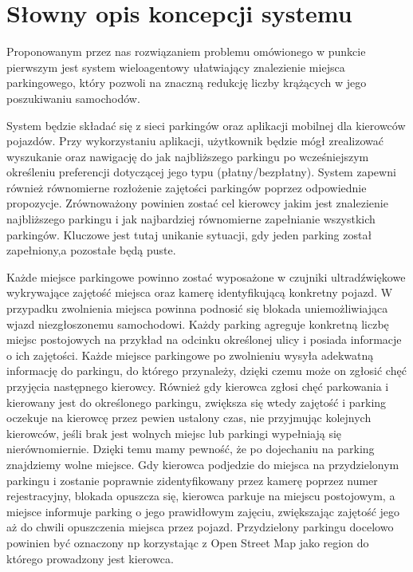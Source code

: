 \newpage
\section{Słowny opis koncepcji systemu}

Proponowanym przez nas rozwiązaniem problemu omówionego w punkcie pierwszym jest system wieloagentowy ułatwiający znalezienie miejsca parkingowego, który pozwoli na znaczną redukcję liczby krążących w jego poszukiwaniu samochodów.

System będzie składać się z sieci parkingów oraz aplikacji mobilnej dla kierowców pojazdów. Przy wykorzystaniu aplikacji, użytkownik będzie mógł zrealizować wyszukanie oraz nawigację do jak najbliższego parkingu po wcześniejszym określeniu preferencji dotyczącej jego typu (płatny/bezpłatny).  System zapewni również równomierne rozłożenie zajętości parkingów poprzez odpowiednie propozycje. Zrównoważony powinien zostać cel kierowcy jakim jest znalezienie najbliższego parkingu i jak najbardziej równomierne zapełnianie wszystkich parkingów. Kluczowe jest tutaj unikanie sytuacji, gdy  jeden parking został zapełniony,a pozostałe będą puste.

Każde miejsce parkingowe powinno zostać wyposażone w czujniki ultradźwiękowe wykrywające zajętość miejsca oraz kamerę identyfikującą konkretny pojazd. W przypadku zwolnienia miejsca powinna podnosić się blokada uniemożliwiająca wjazd niezgłoszonemu samochodowi. Każdy parking agreguje konkretną liczbę miejsc postojowych na przykład na odcinku określonej ulicy i posiada informacje o ich zajętości. Każde miejsce parkingowe po zwolnieniu wysyła adekwatną informację do parkingu, do którego przynależy, dzięki czemu może on zgłosić chęć przyjęcia następnego kierowcy. Również gdy kierowca zgłosi chęć parkowania i kierowany jest do określonego parkingu, zwiększa się wtedy zajętość i parking oczekuje na kierowcę przez pewien ustalony czas, nie przyjmując kolejnych kierowców, jeśli brak jest wolnych miejsc lub parkingi wypełniają się nierównomiernie. Dzięki temu mamy pewność, że po dojechaniu na parking znajdziemy wolne miejsce. Gdy kierowca podjedzie do miejsca na przydzielonym parkingu i zostanie poprawnie zidentyfikowany przez kamerę poprzez numer rejestracyjny, blokada opuszcza się, kierowca parkuje na miejscu postojowym, a miejsce informuje parking o jego prawidłowym zajęciu, zwiększając zajętość jego aż do chwili opuszczenia miejsca przez pojazd. Przydzielony parkingu docelowo powinien być oznaczony np korzystając z Open Street Map jako region do którego prowadzony jest kierowca.

